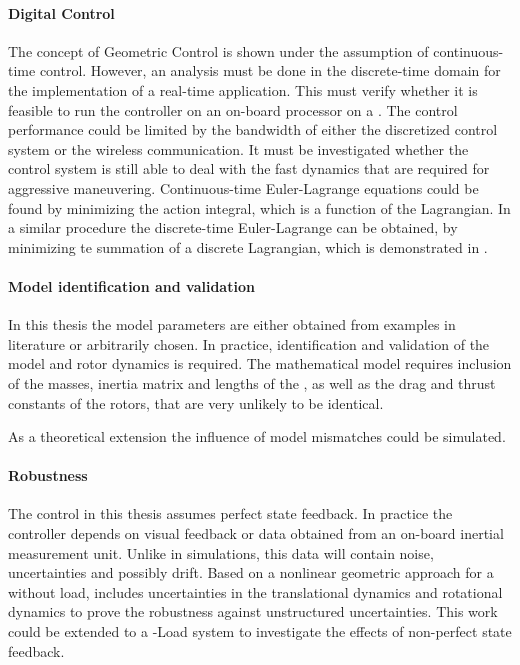 \paragraph{Digital Control} The concept of Geometric Control is shown under the assumption of continuous-time control. 
However, an analysis must be done in the discrete-time domain for the implementation of a real-time application. This must verify whether it is feasible to run the controller on an on-board processor on a . The control performance could be limited by the bandwidth of either the discretized control system or the wireless communication.
It must be investigated whether the control system is still able to deal with the fast dynamics that are required for aggressive maneuvering. 
Continuous-time Euler-Lagrange equations could be found by minimizing the action integral, which is a function of the Lagrangian. In a similar procedure the discrete-time Euler-Lagrange can be obtained, by minimizing te summation of a discrete Lagrangian, which is demonstrated in \cite{Lee2008}. 

\paragraph{Model identification and validation}
In this thesis the model parameters are either obtained from examples in literature or arbitrarily chosen. In practice, identification and validation of the  model and rotor dynamics is required.
The mathematical model requires inclusion of the masses, inertia matrix and lengths of the , as well as the drag and thrust constants of the rotors, that are very unlikely to be identical.

As a theoretical extension the influence of model mismatches could be simulated.

\paragraph{Robustness}
The control in this thesis assumes perfect state feedback. In practice the controller depends on visual feedback or data obtained from an on-board inertial measurement unit. Unlike in simulations, this data will contain noise, uncertainties and possibly drift. 
Based on a nonlinear geometric approach for a  without load, \cite{Goodarzi2013a} includes uncertainties in the translational dynamics and rotational dynamics to prove the robustness against unstructured uncertainties. This work could be extended to a -Load system to investigate the effects of non-perfect state feedback. 

